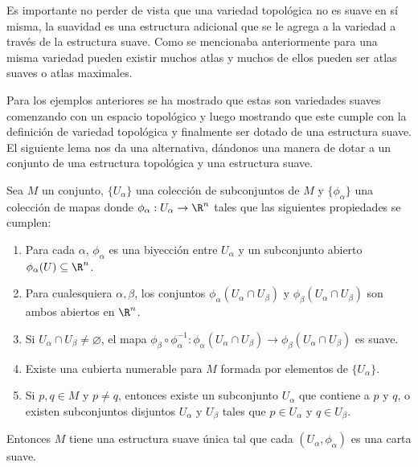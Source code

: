 Es importante no perder de vista que una variedad topológica no es suave en sí misma, la suavidad es una estructura adicional que se le agrega a la variedad a través de la estructura suave. Como se mencionaba anteriormente para una misma variedad pueden existir muchos atlas y muchos de ellos pueden ser atlas suaves o atlas maximales.

Para los ejemplos anteriores se ha mostrado que estas son variedades suaves comenzando con un espacio topológico y luego mostrando que este cumple con la definición de variedad topológica y finalmente ser dotado de una estructura suave. El siguiente lema nos da una alternativa, dándonos una manera de dotar a un conjunto de una estructura topológica y  una estructura suave.

\begin{lemma}\label{Lemma: Lema de Cartas Suaves de una Variedad}
	Sea $M$ un conjunto, $\{U_\alpha\}$ una colección de subconjuntos de $M$ y $\{\phi_\alpha\}$ una colección de mapas donde $\phi_\alpha: U_\alpha \to \R^n$ tales que las siguientes propiedades se cumplen:

	\begin{enumerate}
		\item Para cada $\alpha$, $\phi_\alpha$ es una biyección entre $U_\alpha$ y un subconjunto abierto $\phi_\alpha(U) \subseteq \R^n$.
		\item Para cualesquiera $\alpha, \beta$, los conjuntos $\phi_{\alpha}(U_\alpha \cap U_\beta)$ y $\phi_{\beta}(U_\alpha \cap U_{\beta})$ son ambos abiertos en $\R^n$.
		\item Si $U_\alpha \cap U_\beta \neq \varnothing$, el mapa $\phi_{\beta} \circ \phi_{\alpha}^{-1}: \phi_{\alpha}(U_{\alpha} \cap U_{\beta}) \to \phi_{\beta}(U_{\alpha} \cap U_{\beta})$ es suave.
		\item Existe una cubierta numerable para $M$ formada por elementos de $\{U_\alpha\}$.
		\item Si $p,q \in M$ y $p \neq q$, entonces existe un subconjunto $U_\alpha$ que contiene a $p$ y $q$, o existen subconjuntos disjuntos $U_{\alpha}$ y $U_{\beta}$ tales que $p \in U_{\alpha}$ y $q \in U_{\beta}$.
	\end{enumerate}

	Entonces $M$ tiene una estructura suave única tal que cada $(U_{\alpha},\phi_{\alpha})$ es una carta suave.
\end{lemma}


